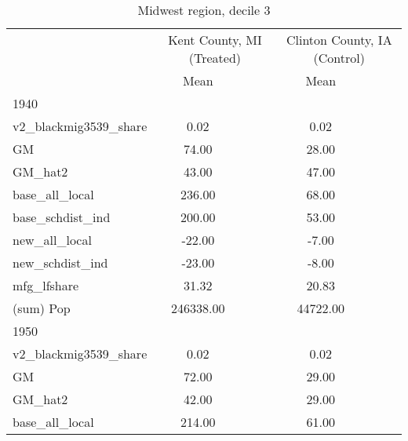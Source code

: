 \begin{table}[htbp]\centering
\def\sym#1{\ifmmode^{#1}\else\(^{#1}\)\fi}
\caption{Midwest region, decile 3 \label{tab1}}
\begin{tabular}{l*{2}{ccc}}
\toprule
                    &\multicolumn{3}{c}{Kent County, MI (Treated)}&\multicolumn{3}{c}{Clinton County, IA (Control)}\\
                    &        Mean&            &            &        Mean&            &            \\
\midrule
1940                &            &            &            &            &            &            \\
v2\_blackmig3539\_share&        0.02&            &            &        0.02&            &            \\
GM                  &       74.00&            &            &       28.00&            &            \\
GM\_hat2             &       43.00&            &            &       47.00&            &            \\
base\_all\_local      &      236.00&            &            &       68.00&            &            \\
base\_schdist\_ind    &      200.00&            &            &       53.00&            &            \\
new\_all\_local       &      -22.00&            &            &       -7.00&            &            \\
new\_schdist\_ind     &      -23.00&            &            &       -8.00&            &            \\
mfg\_lfshare         &       31.32&            &            &       20.83&            &            \\
(sum) Pop           &   246338.00&            &            &    44722.00&            &            \\
\midrule
1950                &            &            &            &            &            &            \\
v2\_blackmig3539\_share&        0.02&            &            &        0.02&            &            \\
GM                  &       72.00&            &            &       29.00&            &            \\
GM\_hat2             &       42.00&            &            &       29.00&            &            \\
base\_all\_local      &      214.00&            &            &       61.00&            &            \\

\end{tabular}
\end{table}
